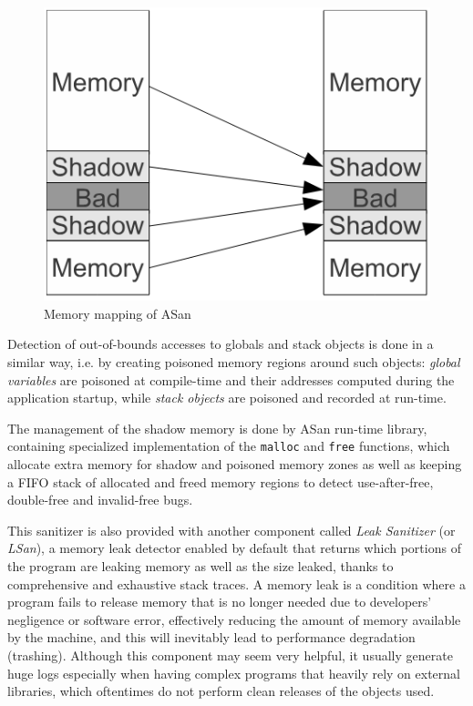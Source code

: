\begin{figure}[h]
\centering
\includegraphics[scale=0.6]{foto/shadow_memory.png}
\caption{Memory mapping of ASan \cite{serebryany2012addresssanitizer}}
\label{fig:asan_shadow}
\end{figure}

Detection of out-of-bounds accesses to globals and stack objects is done in a similar way, i.e. by creating poisoned memory regions around such objects: \textit{global variables} are poisoned at compile-time and their addresses computed during the application startup, while \textit{stack objects} are poisoned and recorded at run-time.

The management of the shadow memory is done by ASan run-time library, containing specialized implementation of the \verb|malloc| and \verb|free| functions, which allocate extra memory for shadow and poisoned memory zones as well as keeping a FIFO stack of allocated and freed memory regions to detect use-after-free, double-free and invalid-free bugs.

This sanitizer is also provided with another component called \textit{Leak Sanitizer} (or \textit{LSan}), a memory leak detector enabled by default that returns which portions of the program are leaking memory as well as the size leaked, thanks to comprehensive and exhaustive stack traces. A memory leak is a condition where a program fails to release memory that is no longer needed due to developers' negligence or software error, effectively reducing the amount of memory available by the machine, and this will inevitably lead to performance degradation (trashing). Although this component may seem very helpful, it usually generate huge logs especially when having complex programs that heavily rely on external libraries, which oftentimes do not perform clean releases of the objects used.

